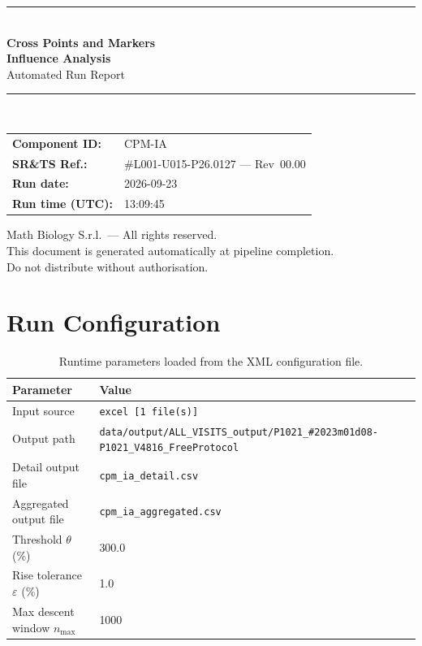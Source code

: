 \documentclass[a4paper,11pt]{article}
\begin{document}
\begin{titlepage}
\begin{center}
  \vspace*{1.8cm}
  {\color{dmaaccent}\rule{\linewidth}{1.5pt}}\\[0.6cm]
  {\LARGE\bfseries\color{dmaaccent}
    Cross Points and Markers\\[0.25cm]
    Influence Analysis}\\[0.4cm]
  {\Large Automated Run Report}\\[0.3cm]
  {\color{dmaaccent}\rule{\linewidth}{1.5pt}}\\[2cm]

  \begin{tabular}{ll}
    \textbf{Component ID:}   & CPM-IA \\[0.3cm]
    \textbf{SR\&TS Ref.:}    & \#L001-U015-P26.0127 --- Rev~00.00 \\[0.3cm]
    \textbf{Run date:}       & 2026-09-23 \\[0.3cm]
    \textbf{Run time (UTC):} & 13:09:45 \\
  \end{tabular}

  \vfill
  {\color{dmagray}\small
    Math Biology S.r.l.\ --- All rights reserved.\\
    This document is generated automatically at pipeline completion.\\
    Do not distribute without authorisation.}
\end{center}
\end{titlepage}

\tableofcontents
\clearpage

\section{Run Configuration}

\begin{table}[h!]
\centering
\small
\caption{Runtime parameters loaded from the XML configuration file.}
\begin{tabular}{ll}
\toprule
\textbf{Parameter} & \textbf{Value} \\
\midrule
Input source                      & \texttt{excel [1 file(s)]} \\
Output path                       & \texttt{data/output/ALL\_VISITS\_output/P1021\_\#2023m01d08-P1021\_V4816\_FreeProtocol} \\
Detail output file                & \texttt{cpm\_ia\_detail.csv} \\
Aggregated output file            & \texttt{cpm\_ia\_aggregated.csv} \\
Threshold $\theta$ (\%)           & 300.0 \\
Rise tolerance $\varepsilon$ (\%) & 1.0 \\
Max descent window $n_{\max}$     & 1000 \\
\bottomrule
\end{tabular}
\end{table}
\end{document}
